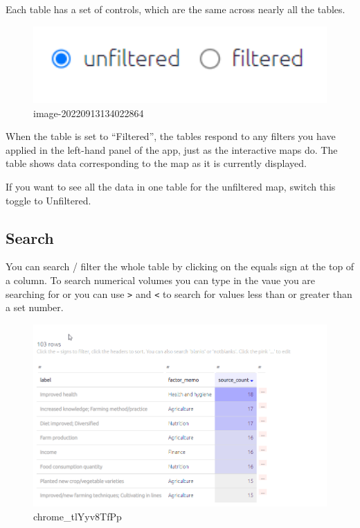 \documentclass[
]{book}
\begin{document}
Each table has a set of controls, which are the same across nearly all the tables.

\begin{figure}
\centering
\includegraphics[width=6.77083in,height=\textheight]{_assets/image-20220913134022864.png}
\caption{image-20220913134022864}
\end{figure}

When the table is set to ``Filtered'', the tables respond to any filters you have applied in the left-hand panel of the app, just as the interactive maps do. The table shows data corresponding to the map as it is currently displayed.

If you want to see all the data in one table for the unfiltered map, switch this toggle to Unfiltered.

\hypertarget{search-1}{%
\subsection{Search}\label{search-1}}

You can search / filter the whole table by clicking on the equals sign at the top of a column. To search numerical volumes you can type in the vaue you are searching for or you can use \texttt{\textgreater{}} and \texttt{\textless{}} to search for values less than or greater than a set number.

\begin{figure}
\centering
\includegraphics[width=6.77083in,height=\textheight]{_assets/chrome_tlYyv8TfPp.gif}
\caption{chrome\_tlYyv8TfPp}
\end{figure}
\end{document}
